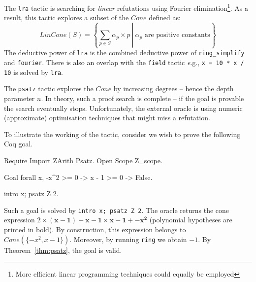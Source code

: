 \label{sec:lra}
The {\tt lra} tactic is searching for \emph{linear} refutations using
Fourier elimination\footnote{More efficient linear programming techniques could equally be employed}.  As a
result, this tactic explores a subset of the $Cone$ defined as:
\[
LinCone(S) =\left\{ \left. \sum_{p \in S} \alpha_p \times p\ \right|\ \alpha_p \mbox{ are positive constants} \right\}
\]
The deductive power of {\tt lra} is the combined deductive power of {\tt ring\_simplify} and {\tt fourier}.
%
There is also an overlap with the {\tt field} tactic {\emph e.g.}, {\tt x = 10 * x / 10} is solved by {\tt lra}.

\label{sec:psatz}
The {\tt psatz} tactic explores the $Cone$ by increasing degrees -- hence the depth parameter $n$.
In theory, such a proof search is complete -- if the goal is provable the search eventually stops.
Unfortunately, the external oracle is using numeric (approximate) optimisation techniques that might miss a
refutation. 

To illustrate the working of the tactic, consider we wish to prove the following Coq goal.\\
\begin{coq_eval}
  Require Import ZArith Psatz.
  Open Scope Z_scope.
\end{coq_eval}
\begin{coq_example*}
  Goal forall x, -x^2 >= 0 -> x - 1 >= 0 -> False.
\end{coq_example*}
\begin{coq_eval}
intro x; psatz Z 2.
\end{coq_eval}
Such a goal is solved by {\tt intro x; psatz Z 2}. The oracle returns the cone expression $2 \times
(\mathbf{x-1}) + \mathbf{x-1}\times\mathbf{x-1} + \mathbf{-x^2}$ (polynomial hypotheses are printed in bold). By construction, this
expression belongs to $Cone(\{-x^2, x -1\})$.  Moreover, by running {\tt ring} we obtain $-1$. By
Theorem~\ref{thm:psatz}, the goal is valid.
%

%

